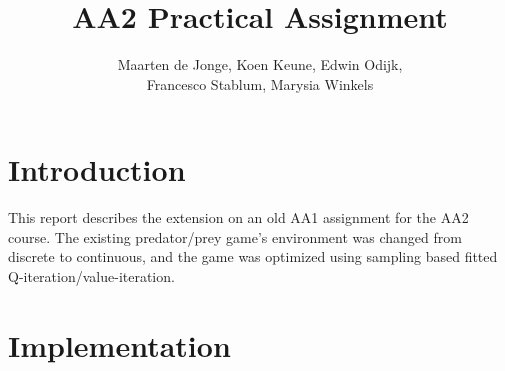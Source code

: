 \documentclass[a4paper, 12pt]{article}
\begin{document}
\title{AA2 Practical Assignment}
\author{Maarten de Jonge, Koen Keune, Edwin Odijk,\\ Francesco Stablum, Marysia Winkels}
\maketitle

\section*{Introduction}
This report describes the extension on an old AA1 assignment for the AA2 course. The existing predator/prey game's environment was changed from discrete to continuous, and the game was optimized using sampling based fitted Q-iteration/value-iteration.%

\section*{Implementation} 
\end{document}
